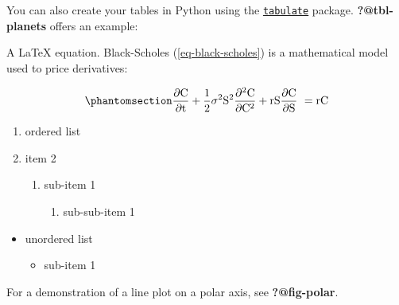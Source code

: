 \documentclass[12pt,british,]{article}
\providecommand{\tightlist}{%
  \setlength{\itemsep}{0pt}\setlength{\parskip}{0pt}}
\begin{document}
You can also create your tables in Python using the
\href{https://pypi.org/project/tabulate/}{\texttt{tabulate}} package.
\textbf{?@tbl-planets} offers an example:

A \LaTeX \hspace{.01cm} equation. Black-Scholes (\ref{eq-black-scholes})
is a mathematical model used to price derivatives:

\begin{equation}\phantomsection\label{eq-black-scholes}{
\frac{\partial \mathrm C}{ \partial \mathrm t } + \frac{1}{2}\sigma^{2} \mathrm S^{2}
\frac{\partial^{2} \mathrm C}{\partial \mathrm C^2}
  + \mathrm r \mathrm S \frac{\partial \mathrm C}{\partial \mathrm S}\ =
  \mathrm r \mathrm C 
}\end{equation}

\begin{enumerate}
\def\labelenumi{\arabic{enumi}.}
\tightlist
\item
  ordered list
\item
  item 2

  \begin{enumerate}
  \def\labelenumii{\roman{enumii})}
  \tightlist
  \item
    sub-item 1

    \begin{enumerate}
    \def\labelenumiii{\Alph{enumiii}.}
    \tightlist
    \item
      sub-sub-item 1
    \end{enumerate}
  \end{enumerate}
\end{enumerate}

\begin{itemize}
\tightlist
\item
  unordered list

  \begin{itemize}
  \tightlist
  \item
    sub-item 1
  \end{itemize}
\end{itemize}

For a demonstration of a line plot on a polar axis, see
\textbf{?@fig-polar}.


\end{document}
